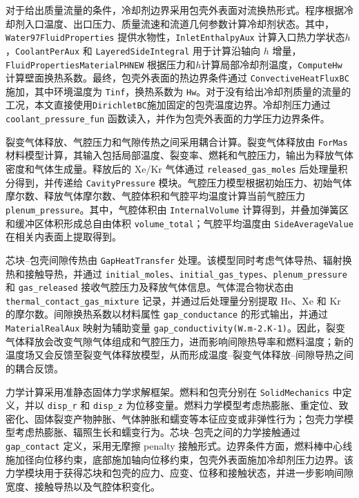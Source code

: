 对于给出质量流量的条件，冷却剂边界采用包壳外表面对流换热形式。程序根据冷却剂入口温度、出口压力、质量流速和流道几何参数计算冷却剂状态。其中，\texttt{Water97\allowbreak FluidProperties} 提供水物性，\texttt{InletEnthalpyAux} 计算入口热力学状态$h$，\texttt{CoolantPerAux} 和 \texttt{LayeredSideIntegral} 用于计算沿轴向 $h$ 增量，\texttt{FluidPropertiesMaterialPHNEW} 根据压力和$h$计算局部冷却剂温度，\texttt{ComputeHw} 计算壁面换热系数。最终，包壳外表面的热边界条件通过 \texttt{Convective\allowbreak HeatFluxBC} 施加，其中环境温度为 \texttt{Tinf}，换热系数为 \texttt{Hw}。对于没有给出冷却剂质量的流量的工况，本文直接使用\texttt{DirichletBC}施加固定的包壳温度边界。冷却剂压力通过 \texttt{coolant\_pressure\_fun} 函数读入，并作为包壳外表面的力学压力边界条件。

裂变气体释放、气腔压力和气隙传热之间采用耦合计算。裂变气体释放由 \texttt{ForMas} 材料模型计算，其输入包括局部温度、裂变率、燃耗和气腔压力，输出为释放气体密度和气体生成量。释放后的 Xe/Kr 气体通过 \texttt{released\_gas\_moles} 后处理量积分得到，并传递给 \texttt{CavityPressure} 模块。气腔压力模型根据初始压力、初始气体摩尔数、释放气体摩尔数、气腔体积和气腔平均温度计算当前气腔压力 \texttt{plenum\_pressure}。其中，气腔体积由 \texttt{InternalVolume} 计算得到，并叠加弹簧区和缓冲区体积形成总自由体积 \texttt{volume\_total}；气腔平均温度由 \texttt{SideAverageValue} 在相关内表面上提取得到。

芯块--包壳间隙传热由 \texttt{GapHeatTransfer} 处理。该模型同时考虑气体导热、辐射换热和接触导热，并通过 \texttt{initial\_moles}、\texttt{initial\_gas\_types}、\texttt{plenum\_pressure} 和 \texttt{gas\_released} 接收气腔压力及释放气体信息。气体混合物状态由 \texttt{thermal\_\allowbreak contact\_\allowbreak gas\_\allowbreak mixture} 记录，并通过后处理量分别提取 He、Xe 和 Kr 的摩尔数。间隙换热系数以材料属性 \texttt{gap\_\allowbreak conductance} 的形式输出，并通过 \texttt{MaterialRealAux} 映射为辅助变量 \texttt{gap\_\allowbreak conductivity(W.m-2.K-1)}。因此，裂变气体释放会改变气隙气体组成和气腔压力，进而影响间隙热导率和燃料温度；新的温度场又会反馈至裂变气体释放模型，从而形成温度--裂变气体释放--间隙导热之间的耦合反馈。

力学计算采用准静态固体力学求解框架。燃料和包壳分别在 \texttt{SolidMechanics} 中定义，并以 \texttt{disp\_r} 和 \texttt{disp\_z} 为位移变量。燃料力学模型考虑热膨胀、重定位、致密化、固体裂变产物肿胀、气体肿胀和蠕变等本征应变或非弹性行为；包壳力学模型考虑热膨胀、辐照生长和蠕变行为。芯块--包壳之间的力学接触通过 \texttt{gap\_contact} 定义，采用无摩擦 penalty 接触形式。边界条件方面，燃料棒中心线施加径向位移约束，底部施加轴向位移约束，包壳外表面施加冷却剂压力边界。该力学模块用于获得芯块和包壳的应力、应变、位移和接触状态，并进一步影响间隙宽度、接触导热以及气腔体积变化。

